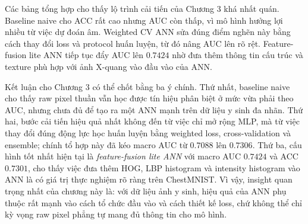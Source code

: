 Các bảng tổng hợp cho thấy lộ trình cải tiến của Chương 3 khá nhất quán. Baseline naive cho ACC rất cao nhưng AUC còn thấp, vì mô hình hưởng lợi nhiều từ việc dự đoán âm. Weighted CV ANN sửa đúng điểm nghẽn này bằng cách thay đổi loss và protocol huấn luyện, từ đó nâng AUC lên rõ rệt. Feature-fusion lite ANN tiếp tục đẩy AUC lên $0.7424$ nhờ đưa thêm thông tin cấu trúc và texture phù hợp với ảnh X-quang vào đầu vào của ANN.

Kết luận cho Chương 3 có thể chốt bằng ba ý chính. Thứ nhất, baseline naive cho thấy raw pixel thuần vẫn học được tín hiệu phân biệt ở mức vừa phải theo AUC, nhưng chưa đủ để tạo ra một ANN mạnh trên dữ liệu y sinh đa nhãn. Thứ hai, bước cải tiến hiệu quả nhất không đến từ việc chỉ mở rộng MLP, mà từ việc thay đổi đúng động lực học huấn luyện bằng weighted loss, cross-validation và ensemble; chính tổ hợp này đã kéo macro AUC từ $0.7088$ lên $0.7306$. Thứ ba, cấu hình tốt nhất hiện tại là \textit{feature-fusion lite ANN} với macro AUC $0.7424$ và ACC $0.7301$, cho thấy việc đưa thêm HOG, LBP histogram và intensity histogram vào ANN là có giá trị thực nghiệm rõ ràng trên ChestMNIST. Vì vậy, insight quan trọng nhất của chương này là: với dữ liệu ảnh y sinh, hiệu quả của ANN phụ thuộc rất mạnh vào cách tổ chức đầu vào và cách thiết kế loss, chứ không thể chỉ kỳ vọng raw pixel phẳng tự mang đủ thông tin cho mô hình.

